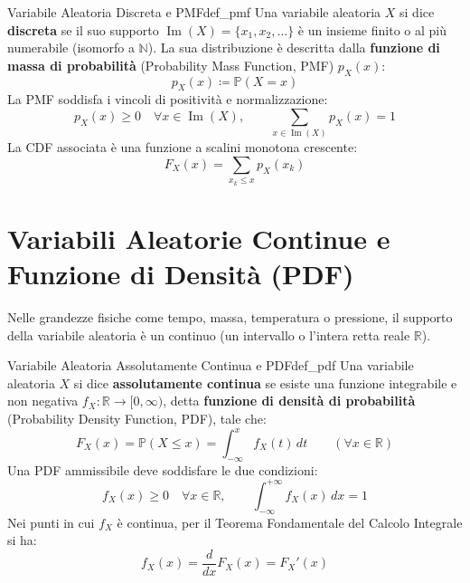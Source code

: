 \begin{definizione}{Variabile Aleatoria Discreta e PMF}{def_pmf}
Una variabile aleatoria $X$ si dice \textbf{discreta} se il suo supporto $\operatorname{Im}(X) = \{x_1, x_2, \dots\}$ è un insieme finito o al più numerabile (isomorfo a $\mathbb{N}$). La sua distribuzione è descritta dalla \textbf{funzione di massa di probabilità} (Probability Mass Function, PMF) $p_X(x)$:
\begin{equation}
    p_X(x) \coloneqq \mathbb{P}(X = x)
\end{equation}
La PMF soddisfa i vincoli di positività e normalizzazione:
\begin{equation}
    p_X(x) \ge 0 \quad \forall x \in \operatorname{Im}(X), \qquad \sum_{x \in \operatorname{Im}(X)} p_X(x) = 1
\end{equation}
La CDF associata è una funzione a scalini monotona crescente:
\begin{equation}
    F_X(x) = \sum_{x_k \le x} p_X(x_k)
\end{equation}
\end{definizione}

\section{Variabili Aleatorie Continue e Funzione di Densità (PDF)}
\label{sec:va_continue_pdf}

Nelle grandezze fisiche come tempo, massa, temperatura o pressione, il supporto della variabile aleatoria è un continuo (un intervallo o l'intera retta reale $\mathbb{R}$).

\begin{definizione}{Variabile Aleatoria Assolutamente Continua e PDF}{def_pdf}
Una variabile aleatoria $X$ si dice \textbf{assolutamente continua} se esiste una funzione integrabile e non negativa $f_X: \mathbb{R} \to [0, \infty)$, detta \textbf{funzione di densità di probabilità} (Probability Density Function, PDF), tale che:
\begin{equation}
    F_X(x) = \mathbb{P}(X \le x) = \int_{-\infty}^x f_X(t) \, dt \qquad (\forall x \in \mathbb{R})
\end{equation}
Una PDF ammissibile deve soddisfare le due condizioni:
\begin{equation}
    f_X(x) \ge 0 \quad \forall x \in \mathbb{R}, \qquad \int_{-\infty}^{+\infty} f_X(x) \, dx = 1
\end{equation}
Nei punti in cui $f_X$ è continua, per il Teorema Fondamentale del Calcolo Integrale si ha:
\begin{equation}
    f_X(x) = \frac{d}{dx} F_X(x) = F_X'(x)
\end{equation}
\end{definizione}

